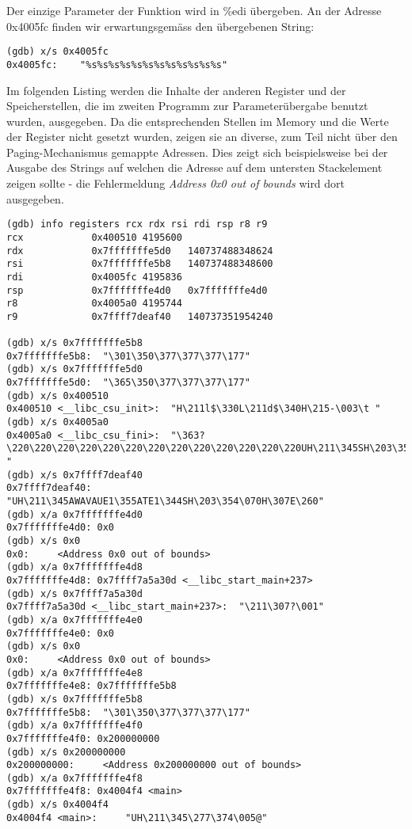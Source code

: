 \documentclass[a4paper,11pt,parskip=half]{scrartcl}
\begin{document}
Der einzige Parameter der Funktion wird in \%edi übergeben. An der Adresse 0x4005fc finden wir erwartungsgemäss den übergebenen String:
\begin{lstlisting}
(gdb) x/s 0x4005fc
0x4005fc:	 "%s%s%s%s%s%s%s%s%s%s%s%s"
\end{lstlisting}

Im folgenden Listing werden die Inhalte der anderen Register und der Speicherstellen, die im zweiten Programm zur Parameterübergabe benutzt wurden, ausgegeben. Da die entsprechenden Stellen im Memory und die Werte der Register nicht gesetzt wurden, zeigen sie an diverse, zum Teil nicht über den Paging-Mechanismus gemappte Adressen. Dies zeigt sich beispielsweise bei der Ausgabe des \glqq{}Strings\grqq{} auf welchen die Adresse auf dem untersten Stackelement zeigen sollte - die Fehlermeldung \emph{Address 0x0 out of bounds} wird dort ausgegeben.
\begin{lstlisting}
(gdb) info registers rcx rdx rsi rdi rsp r8 r9
rcx            0x400510	4195600
rdx            0x7fffffffe5d0	140737488348624
rsi            0x7fffffffe5b8	140737488348600
rdi            0x4005fc	4195836
rsp            0x7fffffffe4d0	0x7fffffffe4d0
r8             0x4005a0	4195744
r9             0x7ffff7deaf40	140737351954240

(gdb) x/s 0x7fffffffe5b8
0x7fffffffe5b8:	 "\301\350\377\377\377\177"
(gdb) x/s 0x7fffffffe5d0
0x7fffffffe5d0:	 "\365\350\377\377\377\177"
(gdb) x/s 0x400510
0x400510 <__libc_csu_init>:	 "H\211l$\330L\211d$\340H\215-\003\t "
(gdb) x/s 0x4005a0
0x4005a0 <__libc_csu_fini>:	 "\363?\220\220\220\220\220\220\220\220\220\220\220\220\220UH\211\345SH\203\354\bH\213\005h\b "
(gdb) x/s 0x7ffff7deaf40
0x7ffff7deaf40:	 "UH\211\345AWAVAUE1\355ATE1\344SH\203\354\070H\307E\260"
(gdb) x/a 0x7fffffffe4d0
0x7fffffffe4d0:	0x0
(gdb) x/s 0x0
0x0:	 <Address 0x0 out of bounds>
(gdb) x/a 0x7fffffffe4d8
0x7fffffffe4d8:	0x7ffff7a5a30d <__libc_start_main+237>
(gdb) x/s 0x7ffff7a5a30d
0x7ffff7a5a30d <__libc_start_main+237>:	 "\211\307?\001"
(gdb) x/a 0x7fffffffe4e0
0x7fffffffe4e0:	0x0
(gdb) x/s 0x0
0x0:	 <Address 0x0 out of bounds>
(gdb) x/a 0x7fffffffe4e8
0x7fffffffe4e8:	0x7fffffffe5b8
(gdb) x/s 0x7fffffffe5b8
0x7fffffffe5b8:	 "\301\350\377\377\377\177"
(gdb) x/a 0x7fffffffe4f0
0x7fffffffe4f0:	0x200000000
(gdb) x/s 0x200000000
0x200000000:	 <Address 0x200000000 out of bounds>
(gdb) x/a 0x7fffffffe4f8
0x7fffffffe4f8:	0x4004f4 <main>
(gdb) x/s 0x4004f4
0x4004f4 <main>:	 "UH\211\345\277\374\005@"
\end{lstlisting}
\end{document}
